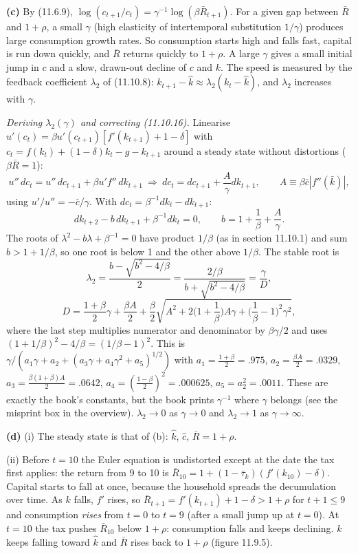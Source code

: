 \documentclass[12pt, letterpaper]{article}
\newcommand{\Rb}{\bar R}
\newcommand{\kb}{\bar k}
\newcommand{\cb}{\bar c}
\begin{document}
\begin{tcolorbox}[oddbox,title={Exercise 11.7 \quad Capital taxes: unforeseen, foreseen, and the role of $\gamma$}]
\textbf{(c)} By (11.6.9), $\log(c_{t+1}/c_t)=\gamma^{-1}\log(\beta\Rb_{t+1})$. For a given gap between $\Rb$ and $1+\rho$,
a small $\gamma$ (high elasticity of intertemporal substitution $1/\gamma$) produces large consumption growth rates. So
consumption starts high and falls fast, capital is run down quickly, and $\Rb$ returns quickly to $1+\rho$. A large
$\gamma$ gives a small initial jump in $c$ and a slow, drawn-out decline of $c$ and $k$. The speed is measured by the
feedback coefficient $\lambda_2$ of (11.10.8): $k_{t+1}-\hat k\approx\lambda_2(k_t-\hat k)$, and $\lambda_2$ increases
with $\gamma$.

\emph{Deriving $\lambda_2(\gamma)$ and correcting (11.10.16).} Linearise $u'(c_t)=\beta u'(c_{t+1})[f'(k_{t+1})+1-\delta]$
with $c_t=f(k_t)+(1-\delta)k_t-g-k_{t+1}$ around a steady state without distortions ($\beta\Rb=1$):
\[
u''\,dc_t=u''\,dc_{t+1}+\beta u'f''\,dk_{t+1}\ \Rightarrow\ dc_t=dc_{t+1}+\frac{A}{\gamma}dk_{t+1},\qquad
A\equiv\beta\cb|f''(\kb)|,
\]
using $u'/u''=-\cb/\gamma$. With $dc_t=\beta^{-1}dk_t-dk_{t+1}$:
\[
dk_{t+2}-b\,dk_{t+1}+\beta^{-1}dk_t=0,\qquad b=1+\frac1\beta+\frac A\gamma .
\]
The roots of $\lambda^2-b\lambda+\beta^{-1}=0$ have product $1/\beta$ (as in section 11.10.1) and sum $b>1+1/\beta$, so one
root is below 1 and the other above $1/\beta$. The stable root is
\[
\lambda_2=\frac{b-\sqrt{b^2-4/\beta}}2=\frac{2/\beta}{b+\sqrt{b^2-4/\beta}}=\frac{\gamma}{D},
\]
\[
D=\frac{1+\beta}2\gamma+\frac{\beta A}2+\frac\beta2\sqrt{A^2+2\Big(1+\frac1\beta\Big)A\gamma+\Big(\frac1\beta-1\Big)^2\gamma^2},
\]
where the last step multiplies numerator and denominator by $\beta\gamma/2$ and uses $(1+1/\beta)^2-4/\beta=(1/\beta-1)^2$. This is
$\gamma/(a_1\gamma+a_2+(a_3\gamma+a_4\gamma^2+a_5)^{1/2})$ with $a_1=\frac{1+\beta}2=.975$, $a_2=\frac{\beta A}2=.0329$,
$a_3=\frac{\beta(1+\beta)A}2=.0642$, $a_4=(\frac{1-\beta}2)^2=.000625$, $a_5=a_2^2=.0011$. These are exactly the book's
constants, but the book prints $\gamma^{-1}$ where $\gamma$ belongs (see the misprint box in the overview). $\lambda_2\to0$ as
$\gamma\to0$ and $\lambda_2\to1$ as $\gamma\to\infty$.

\textbf{(d)} (i) The steady state is that of (b): $\hat k$, $\hat c$, $\Rb=1+\rho$.

(ii) Before $t=10$ the Euler equation is undistorted except at the date the tax first applies: the return from 9 to 10
is $\Rb_{10}=1+(1-\bar\tau_k)(f'(k_{10})-\delta)$. Capital starts to fall at once, because the household spreads the
decumulation over time. As $k$ falls, $f'$ rises, so $\Rb_{t+1}=f'(k_{t+1})+1-\delta>1+\rho$ for $t+1\le9$ and consumption
\emph{rises} from $t=0$ to $t=9$ (after a small jump up at $t=0$). At $t=10$ the tax pushes $\Rb_{10}$ below $1+\rho$:
consumption falls and keeps declining. $k$ keeps falling toward $\hat k$ and $\Rb$ rises back to $1+\rho$ (figure 11.9.5).


\end{tcolorbox}
\end{document}
